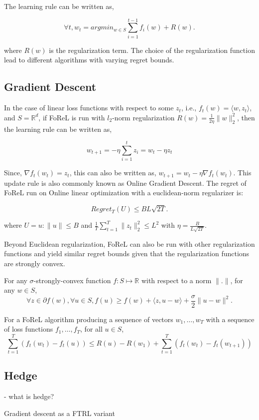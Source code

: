 The learning rule can be written as,

$$\forall t, w_t = argmin_{w \in S}
	\sum_{i=1}^{t-1} f_i(w) + R(w).
$$

where $R(w)$ is the regularization term.
The choice of the regularization function lead to different algorithms with varying regret bounds.

\subsection{Gradient Descent}

In the case of linear loss functions with respect to some $z_t$, i.e., $f_t(w) = \langle w, z_t
	\rangle$, and $S=\mathbb{R}^d$, if FoReL is run with $l_2$-norm regularization $R(w) = \frac{1}{2
		\eta} \|w\|_2^2$, then the learning rule can be written as,

\begin{equation}
	w_{t+1} = -\eta \sum_{i=1}^t z_i = w_t - \eta z_t
\end{equation}

Since, $\nabla
	f_t(w_t) = z_t$, this can also be written as, $w_{t+1} = w_t - \eta \nabla f_t(w_t)$.
This update rule is also commonly known as Online Gradient Descent.
The regret of FoReL run on Online linear optimization with a euclidean-norm regularizer is:

$$Regret_T(U) \leq BL \sqrt {2T}.
$$

where $U = {u : \|u\| \leq B}$ and $\frac{1}{T} \sum_{t=1}^T \|z_t\|_2^2 \leq L^2$ with $\eta = \frac{B}{L\sqrt{2T}}$.

Beyond Euclidean regularization, FoReL can also be run with other regularization functions and
yield similar regret bounds given that the regularization functions are strongly convex.

\begin{definition}
	For any $\sigma$-strongly-convex function $f: S \mapsto \mathbb{R}$ with respect to a norm $\|.
		\|$, for any $w \in S$,
	\begin{equation}
		\forall z \in \partial f(w), \forall u \in S, f(u) \geq f(w) + \langle z, u - w\rangle + \frac{\sigma}{2}\| u - w \|^2.
	\end{equation}
\end{definition}

\begin{lemma}
	\label{lem:forelrb}
	For a FoReL algorithm producing a sequence of vectors $w_1, \ldots, w_T$ with a sequence of loss
	functions $f_1, \ldots, f_T$, for all $u \in S$, $$\sum_{t=1}^T (f_t(w_t) - f_t(u)) \leq R(u) -
		R(w_1) + \sum_{t=1}^T (f_t(w_t) - f_t(w_{t+1}))$$
\end{lemma}

\subsection{Hedge} - what is hedge?

Gradient descent as a FTRL variant